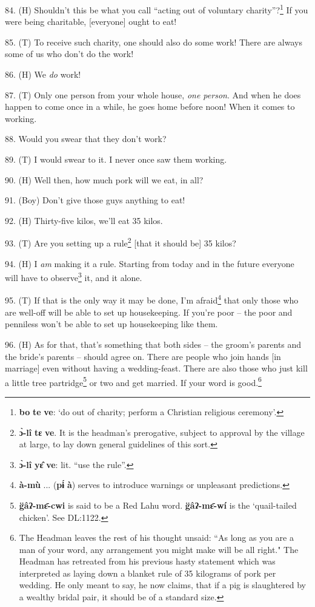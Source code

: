 84. (H) Shouldn't this be what you call ``acting out of voluntary charity''?\footnote{\textbf{bo} \textbf{te} \textbf{ve}: `do out of charity; perform a Christian religious ceremony'.}
If you were being charitable, [everyone] ought to eat!

85. (T) To receive such charity, one should also do some work! There are always
some of us who don't do the work!

86. (H) We \textit{do }work!

87. (T) Only one person from your whole house, \textit{one person}. And when he
does happen to come once in a while, he goes home before noon! When it comes to
working.

88. Would you swear that they don't work?

89. (T) I would swear to it. I never once saw them working.

90. (H) Well then, how much pork will we eat, in all?

91. (Boy) Don't give those guys anything to eat!

92. (H) Thirty-five kilos, we'll eat 35 kilos.

93. (T) Are you setting up a rule\footnote{\textbf{ɔ̀-lî} \textbf{tɛ} \textbf{ve}. It is the headman's prerogative, subject to approval by the village at large, to lay down general guidelines of this sort.} [that it should be] 35 kilos?

94. (H) I \textit{am} making it a rule. Starting from today and in the future everyone
will have to observe\footnote{\textbf{ɔ̀-lî} \textbf{yɛ̂} \textbf{ve}: lit. ``use the rule''.} it, and it alone.

95. (T) If that is the only way it may be done, I'm afraid\footnote{\textbf{à-mù} ... (\textbf{pɨ́} \textbf{à}) serves to introduce warnings or unpleasant predictions.} that only those
who are well-off will be able to set up housekeeping. If you're poor -- the poor
and penniless won't be able to set up housekeeping like them.

96. (H) As for that, that's something that both sides -- the groom's parents and
the bride's parents -- should agree on. There are people who join hands [in marriage]
even without having a wedding-feast. There are also those who just kill a little
tree partridge\footnote{\textbf{g̈âʔ-mɛ̄-cwi} is said to be a Red Lahu word. \textbf{g̈âʔ-mɛ̄-wí} is the `quail-tailed chicken'. See DL:1122.} or two and get married. If your word is good.\footnote{The Headman leaves the rest of his thought unsaid: ``As long as you are a man of your word, any arrangement you might make will be all right." The Headman has retreated from his previous hasty statement which was interpreted as laying down a blanket rule of 35 kilograms of pork per wedding. He only meant to say, he now claims, that if a pig is slaughtered by a wealthy bridal pair, it should be of a standard size.}

